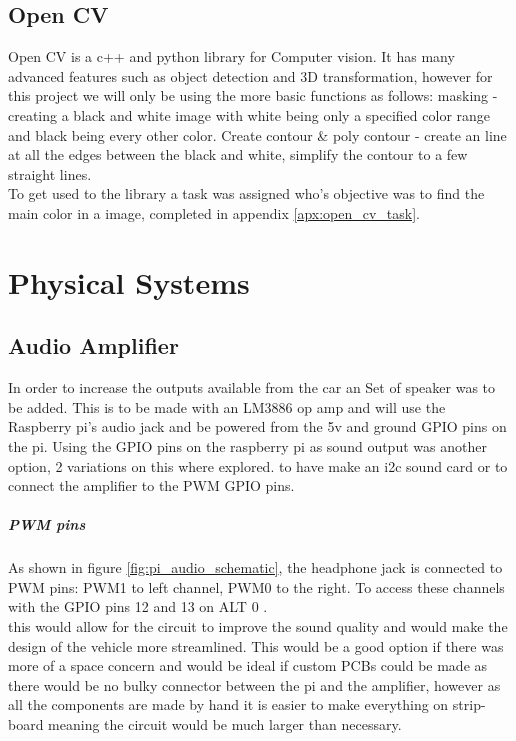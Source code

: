 	\section{Open CV}
	
Open CV is a c++ and python library for Computer vision. It has many advanced features such as object detection and 3D transformation, however for this project we will only be using the more basic functions as follows: masking - creating a black and white image with white being only a specified color range and black being every other color. Create contour \& poly contour - create an line at all the edges between the black and white, simplify the contour to a few straight lines.\\
To get used to the library a task was assigned who's objective was to find the main color in a image, completed in appendix \ref{apx:open_cv_task}.
	
		\chapter{Physical Systems}
	\section{Audio Amplifier}

In order to increase the outputs available from the car	an Set of speaker was to be added. This is to be made with an LM3886 op amp and will use the Raspberry pi's audio jack and be powered from the 5v and ground GPIO pins on the pi. Using the GPIO pins on the raspberry pi as sound output was another option, 2 variations on this where explored. to have make an i2c sound card or to connect the amplifier to the PWM GPIO pins.

\paragraph*{PWM pins}
As shown in figure \ref{fig:pi_audio_schematic}, the headphone jack is connected to PWM pins: PWM1 to left channel, PWM0 to the right. To access these channels with the GPIO pins 12 and 13 on ALT 0 \cite{GPIO_functions}.\\
this would allow for the circuit to improve the sound quality and would make the design of the vehicle more streamlined. This would be a good option if there was more of a space concern and would be ideal if custom PCBs could be made as there would be no bulky connector between the pi and the amplifier, however as all the components are made by hand it is easier to make everything on strip-board meaning the circuit would be much larger than necessary. 

